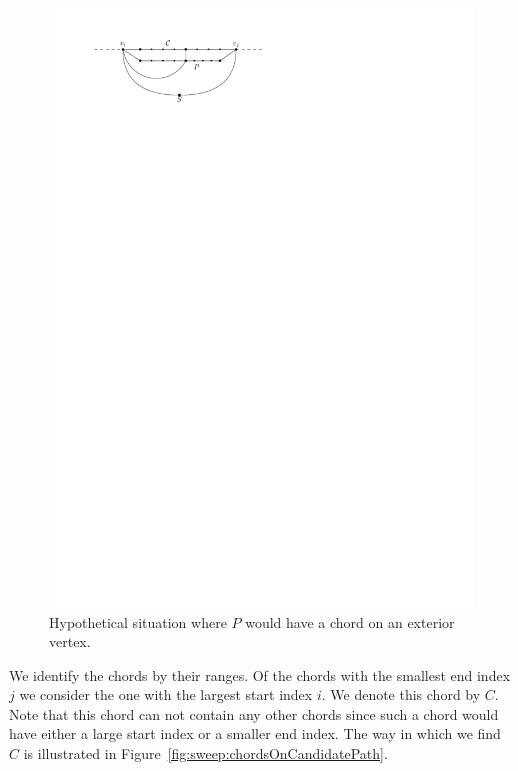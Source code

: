     \begin{figure}[b]
      \centering
      \includegraphics[scale=1]{unifiedAlgo/img/sweep/noChordOnExtriorVertex.pdf}
      \caption{Hypothetical situation where $P$ would have a chord on an exterior vertex.}
      \label{fig:sweep:noChordOnExteriorVertex}
    \end{figure}

    We identify the chords by their ranges. Of the chords with the smallest end index $j$ we consider the one with the largest start index $i$. We denote this chord by $C$.
    Note that this chord can not contain any other chords since such a chord would have either a large start index or a smaller end index.
    The way in which we find $C$ is illustrated in Figure~\ref{fig:sweep:chordsOnCandidatePath}.

